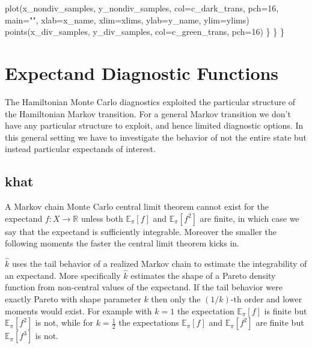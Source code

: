 \documentclass[
  letterpaper,
  DIV=11,
  numbers=noendperiod]{scrartcl}
\newenvironment{Shaded}{\begin{snugshade}}{\end{snugshade}}
\newcommand{\AttributeTok}[1]{\textcolor[rgb]{0.40,0.45,0.13}{#1}}
\newcommand{\DecValTok}[1]{\textcolor[rgb]{0.68,0.00,0.00}{#1}}
\newcommand{\FunctionTok}[1]{\textcolor[rgb]{0.28,0.35,0.67}{#1}}
\newcommand{\NormalTok}[1]{\textcolor[rgb]{0.00,0.23,0.31}{#1}}
\newcommand{\StringTok}[1]{\textcolor[rgb]{0.13,0.47,0.30}{#1}}
\begin{document}
\begin{Shaded}
\begin{Highlighting}[]
      \FunctionTok{plot}\NormalTok{(x\_nondiv\_samples, y\_nondiv\_samples,}
           \AttributeTok{col=}\NormalTok{c\_dark\_trans, }\AttributeTok{pch=}\DecValTok{16}\NormalTok{, }\AttributeTok{main=}\StringTok{""}\NormalTok{,}
           \AttributeTok{xlab=}\NormalTok{x\_name, }\AttributeTok{xlim=}\NormalTok{xlims, }\AttributeTok{ylab=}\NormalTok{y\_name, }\AttributeTok{ylim=}\NormalTok{ylims)}
      \FunctionTok{points}\NormalTok{(x\_div\_samples, y\_div\_samples,}
             \AttributeTok{col=}\NormalTok{c\_green\_trans, }\AttributeTok{pch=}\DecValTok{16}\NormalTok{)}
\NormalTok{    \}}
\NormalTok{  \}}
\NormalTok{\}}
\end{Highlighting}
\end{Shaded}

\hypertarget{expectand-diagnostic-functions}{%
\section{Expectand Diagnostic
Functions}\label{expectand-diagnostic-functions}}

The Hamiltonian Monte Carlo diagnostics exploited the particular
structure of the Hamiltonian Markov transition. For a general Markov
transition we don't have any particular structure to exploit, and hence
limited diagnostic options. In this general setting we have to
investigate the behavior of not the entire state but instead particular
expectands of interest.

\hypertarget{khat}{%
\subsection{khat}\label{khat}}

A Markov chain Monte Carlo central limit theorem cannot exist for the
expectand \(f : X \rightarrow \mathbb{R}\) unless both
\(\mathbb{E}_{\pi}[f]\) and \(\mathbb{E}_{\pi}[f^{2}]\) are finite, in
which case we say that the expectand is sufficiently integrable.
Moreover the smaller the following moments the faster the central limit
theorem kicks in.

\(\hat{k}\) uses the tail behavior of a realized Markov chain to
estimate the integrability of an expectand. More specifically
\(\hat{k}\) estimates the shape of a Pareto density function from
non-central values of the expectand. If the tail behavior were exactly
Pareto with shape parameter \(k\) then only the \((1 / k)\)-th order and
lower moments would exist. For example with \(k = 1\) the expectation
\(\mathbb{E}_{\pi}[f]\) is finite but \(\mathbb{E}_{\pi}[f^{2}]\) is
not, while for \(k = \frac{1}{2}\) the expectations
\(\mathbb{E}_{\pi}[f]\) and \(\mathbb{E}_{\pi}[f^{2}]\) are finite but
\(\mathbb{E}_{\pi}[f^{3}]\) is not.
\end{document}
